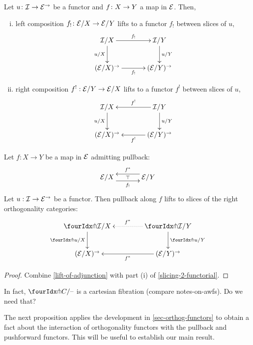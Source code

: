 \documentclass[reqno,10pt,a4paper,oneside]{amsart}
\begin{document}
\begin{lemma}
\label{slicing-2-functorial}
Let $u \colon \mathcal{I} \to \mathcal{E}^{\to}$ be a functor and $f \colon X \to Y$ a map in $\mathcal{E}$. Then, 
\begin{enumerate}[(i)]
\item left composition $f_! \colon \mathcal{E}/X \to \mathcal{E}/Y$ lifts to a functor $f_!$ between slices of $u$,
\[
\xymatrix@C+1em{
  \cal{I}/X
  \ar[r]^-{f_!}
  \ar[d]_{u/X}
&
  \cal{I}/Y
  \ar[d]^{u/Y}
\\
  (\calE/X)^{\to}
  \ar[r]_-{f_!}
&
  (\calE/Y)^{\to}
}
\]
\item right composition $f^! : \mathcal{E}/Y \to \mathcal{E}/X$ lifts to a functor $f^!$ between slices of $u$,
\[
\xymatrix@C+1em{
  \cal{I}/X
  \ar[d]_{u/X}
&
  \cal{I}/Y
  \ar[l]_-{f^!}
  \ar[d]^{u/Y}
\\
  (\calE/X)^{\to}
&
  (\calE/Y)^{\to}
  \ar[l]^-{f^!}
}
\]
\end{enumerate}
\end{lemma}

\begin{proposition}
\label{lift-pullback}
Let $f : X \to Y$ be a map in $\mathcal{E}$ admitting pullback:
\[
\xymatrix@C+1em{
  \catE/X
  \ar@<-5pt>[r]_{f_!}
  \ar@{}[r]|{\top}
&
  \catE/Y
  \ar@<-5pt>[l]_{f^*}
}
\]
Let $u : \mathcal{I} \to \mathcal{E}^{\to}$ be a functor.
Then pullback along $f$ lifts to slices of the right orthogonality categories:
\[
\xymatrix@C=1.5cm{
  \liftr{\cal{I}}/X
  \ar[d]_{\liftr{u}/X}
&
  \liftr{\cal{I}}/Y
  \ar@{.>}[l]_{f^*}
  \ar[d]^{\liftr{u}/Y}
\\
  (\catE/X)^{\to}
&
  (\catE/Y)^{\to}
  \ar[l]^{f^*}
}
\]
\end{proposition}

\begin{proof}
Combine \cref{lift-of-adjunction} with part (i) of \cref{slicing-2-functorial}.
\end{proof}

\begin{question}
In fact, $\liftr{C}/\text{--}$ is a cartesian fibration (compare notes-on-awfs).
Do we need that?
\end{question}

The next proposition applies the development in \cref{sec-orthog-functors} to obtain 
a fact about the interaction of orthogonality functors with the pullback and pushforward
functors. This will be useful to establish our main result.
\end{document}
